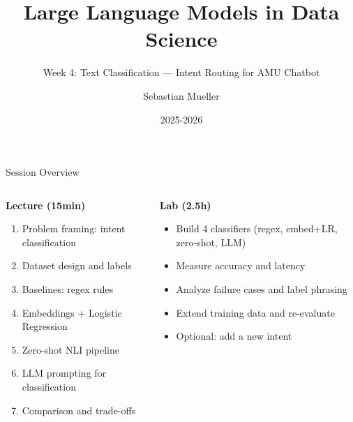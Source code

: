 \documentclass[aspectratio=169]{beamer}
\title{Large Language Models in Data Science}
\subtitle{Week 4: Text Classification — Intent Routing for AMU Chatbot}
\author{Sebastian Mueller}
\institute{Aix-Marseille Universit\'e}
\date{2025-2026}
\begin{document}
\begin{frame}[plain]
  \titlepage
\end{frame}

\begin{frame}{Session Overview}
  \begin{columns}[T,onlytextwidth]
    \begin{column}{0.55\linewidth}
      \textbf{Lecture (15min)}
      \begin{enumerate}
        \item Problem framing: intent classification
        \item Dataset design and labels
        \item Baselines: regex rules
        \item Embeddings + Logistic Regression
        \item Zero-shot NLI pipeline
        \item LLM prompting for classification
        \item Comparison and trade-offs
      \end{enumerate}
    \end{column}
    \begin{column}{0.4\linewidth}
      \textbf{Lab (2.5h)}
      \begin{itemize}
        \item Build 4 classifiers (regex, embed+LR, zero-shot, LLM)
        \item Measure accuracy and latency
        \item Analyze failure cases and label phrasing
        \item Extend training data and re-evaluate
        \item Optional: add a new intent
      \end{itemize}
    \end{column}
  \end{columns}
\end{frame}
\end{document}

